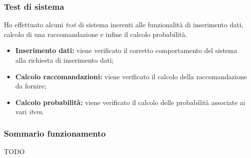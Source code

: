 \subsubsection{Test di sistema}
Ho effettuato alcuni \emph{test} di sistema inerenti alle funzionalità di inserimento dati, calcolo di una raccomandazione e infine il calcolo probabilità.
\begin{itemize}
\item \textbf{Inserimento dati:} viene verificato il corretto comportamento del sistema alla richiesta di inserimento dati;
\item \textbf{Calcolo raccomandazioni:} viene verificato il calcolo della raccomandazione da fornire;
\item \textbf{Calcolo probabilità:} viene verificato il calcolo delle probabilità associate ai vari \emph{item}.
\end{itemize}
\subsubsection{Sommario funzionamento}
TODO
